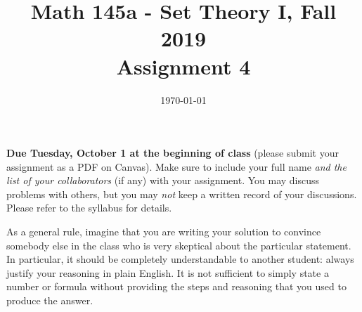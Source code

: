 \documentclass{amsart}
\title[Math 145a, Fall 2019: assignment 4]{Math 145a - Set Theory I, Fall 2019 \\ Assignment 4}
\date{\today}
\theoremstyle{definition}
\begin{document}

\vspace*{-10em}

\maketitle

\textbf{Due Tuesday, October 1 at the beginning of class} (please submit your assignment as a PDF on Canvas). Make sure to include your full name \emph{and the list of your collaborators} (if any) with your assignment. You may discuss problems with others, but you may \emph{not} keep a written record of your discussions. Please refer to the syllabus for details.

As a general rule, imagine that you are writing your solution to convince somebody else in the class who is very skeptical about the particular statement. In particular, it should be completely understandable to another student: always justify your reasoning in plain English. It is not sufficient to simply state a number or formula without providing the steps and reasoning that you used to produce the answer.
\end{document}
